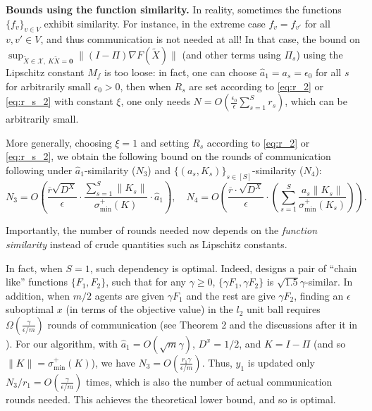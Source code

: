 \documentclass[10pt]{article}
\newcommand{\mc}{\mathcal}
\newcommand{\mb}{\mathbf}
\begin{document}
\textbf{Bounds using the function similarity.}
In reality, sometimes the functions $\{f_v\}_{v\in V}$ exhibit similarity. For instance, in the extreme case $f_v = f_{v'}$ for all $v,v'\in V$, and thus communication is not needed at all! In that case, the bound on $\sup_{\widetilde{X}\in {\mc X},~K\widetilde{X}=\mb 0}\|(I-\Pi) \nabla F(\widetilde{X})\|$ (and other terms using $\Pi_s$) using the Lipschitz constant $M_f$ is too loose: in fact, one can choose $\widehat{a}_1 = a_s=\epsilon_0$ for all $s$ for arbitrarily small $\epsilon_0>0$, then when $R_s$ are set according to \eqref{eq:r_2} or \eqref{eq:r_s_2} with constant $\xi$, one only needs $N = O(\frac{\epsilon_0}{\epsilon}\sum_{s=1}^S r_s)$, which can be arbitrarily small. 

More generally, choosing $\xi=1$ and setting $R_s$ according to \eqref{eq:r_2} or \eqref{eq:r_s_2}, we obtain the following bound on the rounds of communication following under $\widehat{a}_1$-similarity ($N_3$) and $\{(a_s,K_s)\}_{s\in [S]}$-similarity ($N_4$):
\begin{displaymath}
    N_3 =O( \frac{\overline{r} \sqrt{D^X}}{\epsilon}\cdot \frac{\sum_{s=1}^S \|K_s\|}{\sigma_{\min}^+(K)}\cdot \widehat{a}_1),\quad N_4=O( \frac{\overline{r}\cdot \sqrt{D^X}}{\epsilon }\cdot (\sum_{s=1}^S \frac{a_s\|K_s\|}{\sigma_{\min}^+(K_s)})).
\end{displaymath}

 Importantly, the number of rounds needed now depends on the \textit{function similarity} instead of crude quantities such as Lipschitz constants. 

 In fact, when $S=1$, such dependency is optimal. Indeed, \cite{ArjevaniShamir2015Communication} designs a pair of ``chain like'' functions $\{F_1,F_2\}$, such that for any $\gamma\geq 0$, $\{\gamma F_1,\gamma F_2\}$ is $\sqrt{1.5}\gamma$-similar. In addition, when $m/2$ agents are given $\gamma F_1$ and the rest are give $\gamma F_2$, finding an $\epsilon$ suboptimal $x$ (in terms of the objective value) in the $l_2$ unit ball requires $\Omega(\frac{\gamma}{\epsilon/m})$ rounds of communication (see Theorem 2 and the discussions after it in \cite{ArjevaniShamir2015Communication}). For our algorithm, with $\widehat{a}_1 = O(\sqrt{m}\gamma)$, $D^x = 1/2$, and 
 $K = I-\Pi$ (and so $\|K\| = \sigma_{\min}^+(K)$), we have $N_3 = O(\frac{r_1\gamma}{\epsilon/m})$. Thus, $y_1$ is updated only $N_3/r_1=O(\frac{\gamma }{\epsilon/m})$ times, which is also the number of actual communication rounds needed. This achieves the theoretical lower bound, and so is optimal. 
\end{document}

